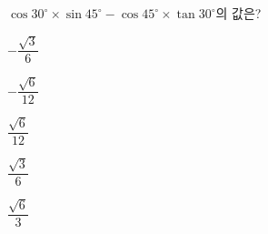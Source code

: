 $\cos 30^\circ\times\sin 45^\circ-\cos 45^\circ\times\tan 30^\circ$의 값은?
\begin{choices32}{\rule[-3ex]{0pt}{8ex}$-\dfrac{\sqrt{3}}{6}$}{\rule[-3ex]{0pt}{8ex}$-\dfrac{\sqrt{6}}{12}$}{\rule[-3ex]{0pt}{8ex}$\dfrac{\sqrt{6}}{12}$}{\rule[-3ex]{0pt}{8ex}$\dfrac{\sqrt{3}}{6}$}{\rule[-3ex]{0pt}{8ex}$\dfrac{\sqrt{6}}{3}$}\end{choices32}
